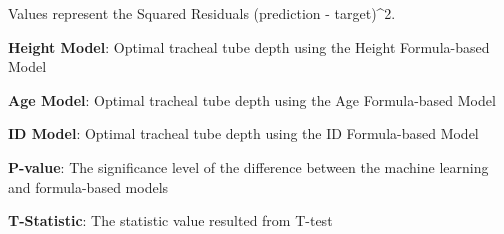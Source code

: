 \documentclass[11pt]{article}
\begin{document}
\begin{table}[h]
\caption{Comparison of Predictive Power of Machine Learning Models Vs. Formula-Based Models}
\label{table:comparison_ml_formulas}
\begin{threeparttable}
\renewcommand{\TPTminimum}{\linewidth}
\begin{tablenotes}
\footnotesize
\item Values represent the Squared Residuals (prediction - target)\textasciicircum{}2.
\item \textbf{Height Model}: Optimal tracheal tube depth using the Height Formula-based Model
\item \textbf{Age Model}: Optimal tracheal tube depth using the Age Formula-based Model
\item \textbf{ID Model}: Optimal tracheal tube depth using the ID Formula-based Model
\item \textbf{P-value}: The significance level of the difference between the machine learning and formula-based models
\item \textbf{T-Statistic}: The statistic value resulted from T-test 
\end{tablenotes}
\end{threeparttable}
\end{table}
\end{document}
